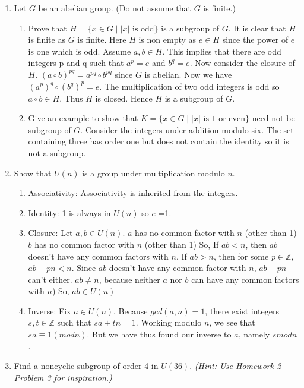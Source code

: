 \documentclass{article}
\newcommand{\ZZ}{\mathbb{Z}}
\begin{document}
\begin{enumerate}
\item Let $G$ be an abelian group. (Do not assume that $G$ is finite.)
	\begin{enumerate}
	\item Prove that $H=\{x\in G\mid|x|\text{ is odd}\}$ is a subgroup of $G$. 
	It is clear that $H$ is finite as $G$ is finite. Here $H$ is non empty as $e\in H$ since the power of $e$ is one which is odd. Assume $a,b \in H$. This implies that there are odd integers p and q such that $a^{p} = e$ and $b^{q} = e$. Now consider the closure of $H$. $(a \circ b)^{pq} = a ^{pq} \circ b^{pq}$ since $G$ is abelian. Now we have $(a^{p})^{q} \circ (b^{q})^{p} = e$. The multiplication of two odd integers is odd so $a \circ b \in H$. Thus $H$ is closed. Hence $H$ is a subgroup of $G$. 
	\item Give an example to show that $K=\{x\in G\mid|x|\text{ is 1 or even}\}$ need not be subgroup of $G$. 
Consider the integers under addition modulo six. The set containing three has order one but does not contain the identity so it is not a subgroup.
	\end{enumerate} 
\item Show that $U(n)$ is a group under multiplication modulo $n$. 
	\begin{enumerate}
	\item Associativity: Associativity is inherited from the integers.
	\item Identity: 1 is always in $U(n)$ so $e$ =1.
	\item  Closure: Let $a,b \in U(n)$. $a$ has no common factor with $n$ (other than 1) $b$ has no common factor with $n$ (other than 1) So, If $ab < n$, then $ab$ doesn't have any common factors with $n$. If $ab>n$, then for some $p\in \ZZ$,$ab-pn < n$. Since $ab$ doesn't have any common factor with $n$, $ab-pn$ can't either. $ab \neq n$, because neither $a$ nor $b$ can have any common factors with $n$) So, $ab \in U(n)$
	\item Inverse:  Fix $a \in U(n)$. Because $gcd(a, n) = 1$, there exist integers $s, t \in \ZZ$ such that
$sa + tn = 1$. Working modulo $n$, we see that $sa \equiv 1 (mod n)$. But we have thus found our
inverse to $a$, namely $s mod n$.
	\end{enumerate}
    
    
    \item Find a noncyclic subgroup of order 4 in $U(36)$. \textit{(Hint: Use Homework 2 Problem 3 for inspiration.)}


\end{enumerate}
\end{document}

